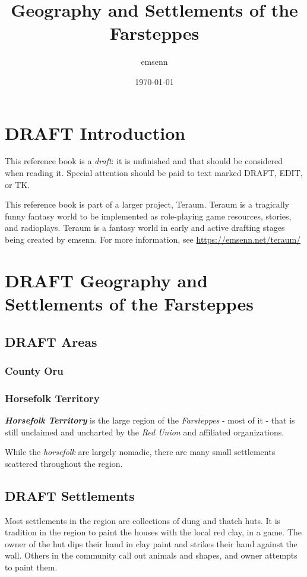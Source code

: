 \documentclass[11pt]{teraum_adventure}
\author{emsenn}
\date{\today}
\title{Geography and Settlements of the Farsteppes}
\begin{document}
\maketitle
{}
\setcounter{tocdepth}{2}
\tableofcontents
\section*{{\bfseries\sffamily DRAFT} Introduction}
\label{sec:orgeb3318c}
This reference book is a \emph{draft}: it is unfinished and that should be considered when reading it. Special attention should be paid to text marked DRAFT, EDIT, or TK.

This reference book is part of a larger project, Teraum. Teraum is a tragically funny fantasy world to be implemented as role-playing game resources, stories, and radioplays. Teraum is a fantasy world in early and active drafting stages being created by emsenn. For more information, see \href{https://emsenn.net/teraum/}{https://emsenn.net/teraum/}
\section*{{\bfseries\sffamily DRAFT} Geography and Settlements of the Farsteppes}
\label{sec:org43bcec0}
\subsection*{{\bfseries\sffamily DRAFT} Areas}
\label{sec:orga585bc2}
\subsubsection*{County Oru}
\label{sec:org9368cb7}
\subsubsection*{Horsefolk Territory}
\label{sec:org36fd714}
\textbf{\emph{Horsefolk Territory}} is the large region of the \emph{Farsteppes} - most
of it - that is still unclaimed and uncharted by the \emph{Red Union} and
affiliated organizations.

While the \emph{horsefolk} are largely nomadic, there are many small
settlements scattered throughout the region.
\subsection*{{\bfseries\sffamily DRAFT} Settlements}
\label{sec:orgf718538}
Most settlements in the region are collections of dung and thatch
huts. It is tradition in the region to paint the houses with the local
red clay, in a game. The owner of the hut dips their hand in clay
paint and strikes their hand against the wall. Others in the community
call out animals and shapes, and owner attempts to paint them.
\end{document}
